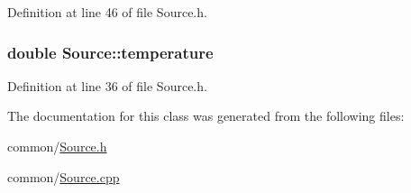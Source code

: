 Definition at line 46 of file Source.h.

\hypertarget{classSource_a01ad608788eb4c0e4a7b2a6228398394}{
\subsubsection[{temperature}]{\setlength{\rightskip}{0pt plus 5cm}double {\bf Source::temperature}}}
\label{classSource_a01ad608788eb4c0e4a7b2a6228398394}


Definition at line 36 of file Source.h.



The documentation for this class was generated from the following files:\begin{DoxyCompactItemize}
\item 
common/\hyperlink{Source_8h}{Source.h}\item 
common/\hyperlink{Source_8cpp}{Source.cpp}\end{DoxyCompactItemize}
